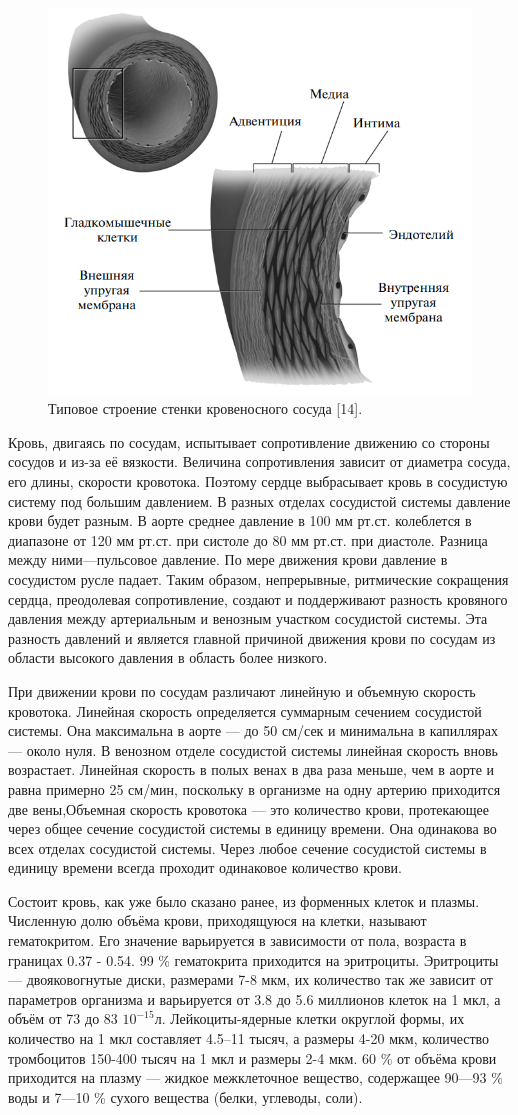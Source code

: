 \begin{figure}[h]
\centering
\includegraphics[width=0.3\linewidth]{stenki.png}
\caption{ Типовое строение стенки кровеносного сосуда [14].}
\label{fig:mpr}
\end{figure}

Кровь, двигаясь по сосудам, испытывает сопротивление движению со стороны сосудов и из-за её вязкости. Величина сопротивления зависит от диаметра сосуда, его длины, скорости кровотока. Поэтому сердце выбрасывает кровь в сосудистую систему под большим давлением. В разных отделах сосудистой системы давление крови будет разным. В аорте среднее давление в 100 мм рт.ст. колеблется в диапазоне от 120 мм рт.ст. при систоле до 80 мм рт.ст. при диастоле. Разница между ними—пульсовое давление. По мере движения крови давление в сосудистом русле падает. Таким образом, непрерывные, ритмические сокращения сердца, преодолевая сопротивление, создают и поддерживают разность кровяного давления между артериальным и венозным участком сосудистой системы. Эта разность давлений и является главной причиной движения крови по сосудам из области высокого давления в область более низкого.

При движении крови по сосудам различают линейную и объемную скорость кровотока. Линейная скорость определяется суммарным сечением сосудистой системы. Она максимальна в аорте — до 50 см/сек и минимальна в капиллярах — около нуля. В венозном отделе сосудистой системы линейная скорость вновь возрастает. Линейная скорость в полых венах в два раза меньше, чем в аорте и равна примерно 25 см/мин, поскольку в организме на одну артерию приходится две вены,Объемная скорость кровотока — это количество крови, протекающее через общее сечение сосудистой системы в единицу времени. Она одинакова во всех отделах сосудистой системы. Через любое сечение сосудистой системы в единицу времени всегда проходит одинаковое количество крови.

Состоит кровь, как уже было сказано ранее, из форменных клеток и плазмы. Численную долю объёма крови, приходящуюся на клетки, называют гематокритом. Его значение варьируется в зависимости от пола, возраста в границах 0.37 - 0.54. 99 \% гематокрита приходится на эритроциты. Эритроциты— двояковогнутые диски, размерами 7-8 мкм, их количество так же зависит от параметров организма и варьируется от 3.8 до 5.6 миллионов клеток на 1 мкл, а объём от 73 до 83 $10^{-15}$л. Лейкоциты-ядерные клетки округлой формы, их количество на 1 мкл составляет 4.5–11 тысяч, а размеры 4-20 мкм, количество тромбоцитов 150-400 тысяч на 1 мкл и размеры 2-4 мкм. 60 \% от объёма крови приходится на плазму — жидкое межклеточное вещество, содержащее 90—93 \% воды и 7—10 \% сухого вещества (белки, углеводы, соли).

